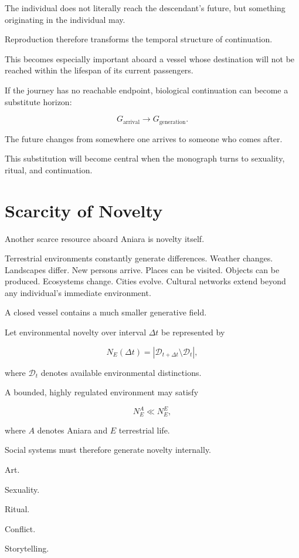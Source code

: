 \documentclass[11pt,oneside]{book}
\theoremstyle{definition}
\theoremstyle{remark}
\newcommand{\D}{\mathcal{D}}
\begin{document}
The individual does not literally reach the descendant's future, but something originating in the individual may.

Reproduction therefore transforms the temporal structure of continuation.

This becomes especially important aboard a vessel whose destination will not be reached within the lifespan of its current passengers.

If the journey has no reachable endpoint, biological continuation can become a substitute horizon:

\[
G_{\mathrm{arrival}}
\rightarrow
G_{\mathrm{generation}}.
\]

The future changes from somewhere one arrives to someone who comes after.

This substitution will become central when the monograph turns to sexuality, ritual, and continuation.

\section{Scarcity of Novelty}

Another scarce resource aboard Aniara is novelty itself.

Terrestrial environments constantly generate differences. Weather changes. Landscapes differ. New persons arrive. Places can be visited. Objects can be produced. Ecosystems change. Cities evolve. Cultural networks extend beyond any individual's immediate environment.

A closed vessel contains a much smaller generative field.

Let environmental novelty over interval \(\Delta t\) be represented by

\[
N_E(\Delta t)
=
|\D_{t+\Delta t}\setminus\D_t|,
\]

where \(\D_t\) denotes available environmental distinctions.

A bounded, highly regulated environment may satisfy

\[
N_E^{A}
\ll
N_E^{E},
\]

where \(A\) denotes Aniara and \(E\) terrestrial life.

Social systems must therefore generate novelty internally.

Art.

Sexuality.

Ritual.

Conflict.

Storytelling.
\end{document}
